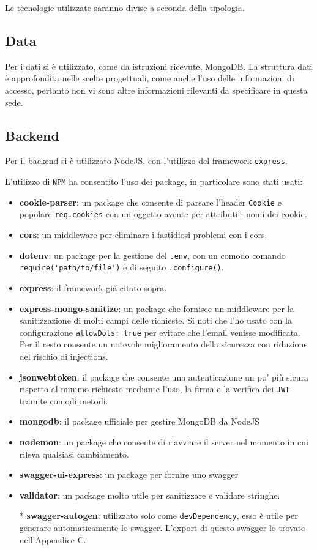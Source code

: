Le tecnologie utilizzate saranno divise a seconda della tipologia.
\subsection{Data}
Per i dati si è utilizzato, come da istruzioni ricevute, MongoDB. La struttura dati è approfondita nelle scelte progettuali, come anche l'uso delle informazioni di accesso, pertanto non vi sono altre informazioni rilevanti da specificare in questa sede.
\subsection{Backend}
Per il backend si è utilizzato \href{https://nodejs.org/en/about}{NodeJS}, con l'utilizzo del framework \verb|express|\cite{express}.

L'utilizzo di \verb|NPM| ha consentito l'uso dei package, in particolare sono stati usati:
\begin{itemize}
    \item \textbf{cookie-parser}: un package che consente di parsare l'header \verb|Cookie| e popolare \verb|req.cookies| con un oggetto avente per attributi i nomi dei cookie\cite{cookie-parser}.
    \item \textbf{cors}: un middleware per eliminare i fastidiosi problemi con i cors\cite{cors}.
    \item \textbf{dotenv}: un package per la gestione del \verb|.env|, con un comodo comando \verb|require('path/to/file')| e di seguito \verb|.configure()|\cite{dotenv}.
    \item \textbf{express}: il framework già citato sopra.
    \item \textbf{express-mongo-sanitize}: un package che fornisce un middleware per la sanitizzazione di molti campi delle richieste. Si noti che l'ho usato con la configurazione \verb|allowDots: true| per evitare che l'email venisse modificata. Per il resto consente un notevole miglioramento della sicurezza con riduzione del rischio di injections\cite{express-mongo-sanitize}.
    \item \textbf{jsonwebtoken}: il package che consente una autenticazione un po' più sicura rispetto al minimo richiesto mediante l'uso, la firma e la verifica dei \verb|JWT| tramite comodi metodi\cite{jsonwebtoken}.
    \item \textbf{mongodb}: il package ufficiale per gestire MongoDB da NodeJS\cite{mongodb-npm}
    \item \textbf{nodemon}: un package che consente di riavviare il server nel momento in cui rileva qualsiasi cambiamento\cite{nodemon}.
    \item \textbf{swagger-ui-express}: un package per fornire uno swagger\cite{swagger-ui-express}
    \item \textbf{validator}: un package molto utile per sanitizzare e validare stringhe\cite{validator}.
    \item[*] \textbf{swagger-autogen}: utilizzato solo come \verb|devDependency|, esso è utile per generare automaticamente lo swagger\cite{swagger-autogen}. L'export di questo swagger lo trovate nell'Appendice C.
\end{itemize}
